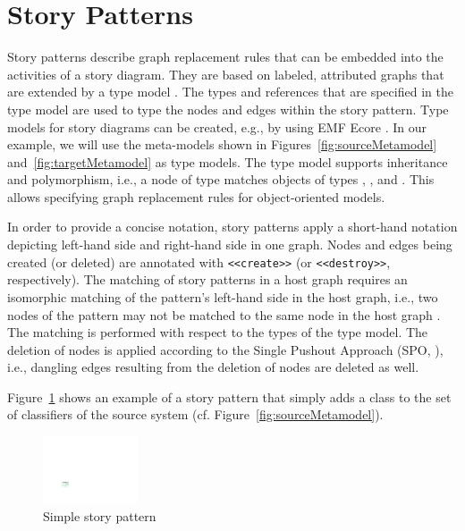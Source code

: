 \section{Story Patterns} \label{sec:StoryPatterns}

Story patterns describe graph replacement rules that can be embedded into the activities of a story diagram. They are based on labeled, attributed graphs that are extended by a type model \cite{FNTZ00}. 
The types and references that are specified in the type model are used to type the nodes and edges within the story pattern.
Type models for story diagrams can be created, e.g., by using EMF Ecore \cite{SBP+08}.
In our example, we will use the meta-models shown in Figures~\ref{fig:sourceMetamodel} and~\ref{fig:targetMetamodel} as type models. The type model supports inheritance and polymorphism, i.e., a node of type  matches objects of types , , and .
This allows specifying graph replacement rules for object-oriented models.

In order to provide a concise notation, story patterns apply a short-hand notation depicting left-hand side and right-hand side in one graph. Nodes and edges being created (or deleted) are annotated with \small \verb|<<create>>| \normalsize (or  {\small \verb|<<destroy>>|\normalsize}, respectively). The matching of story patterns in a host graph requires an isomorphic matching of the pattern's left-hand side in the host graph, i.e., two nodes of the pattern may not be matched to the same node in the host graph \cite{FNTZ00,Roz97}. The matching is performed with respect to the types of the type model. The deletion of nodes is applied according to the Single Pushout Approach (SPO, \cite{Roz97}), i.e., dangling edges resulting from the deletion of nodes are deleted as well.

Figure~\ref{fig:SP} shows an example of a story pattern that simply adds a class to the set of classifiers of the source system (cf. Figure~\ref{fig:sourceMetamodel}).

\begin{figure}[htbp]
\begin{center}
  \includegraphics[width=0.25\textwidth]{figures/StoryPattern}
  \caption{Simple story pattern}
  \label{fig:SP}
\end{center}
\end{figure}